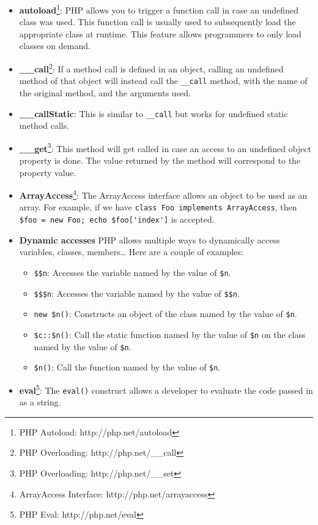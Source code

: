 \documentclass[a4paper]{article}
\begin{document}
\begin{itemize}
  \item \textbf{autoload}\footnote{PHP Autoload: http://php.net/autoload}:
    PHP allows you to trigger a function call in case an undefined class was
    used.  This function call is usually used to subsequently load the
    appropriate class at runtime. This feature allows programmers to only load
    classes on demand.
  \item \textbf{\_\_call}\footnote{PHP Overloading: http://php.net/\_\_call}:
    If a method call is defined in an object, calling an undefined method of
    that object will instead call the \verb&__call& method, with the name of
    the original method, and the arguments used.
  \item \textbf{\_\_callStatic}:
    This is similar to \verb&__call& but works for undefined static method
    calls.
  \item \textbf{\_\_get}\footnote{PHP Overloading: http://php.net/\_\_set}:
    This method will get called in case an access to an undefined object
    property is done. The value returned by the method will correspond to the
    property value.
  \item \textbf{ArrayAccess}\footnote{ArrayAccess Interface: http://php.net/arrayaccess}:
    The ArrayAccess interface allows an object to be used as an array. For example,
    if we have \verb&class Foo implements ArrayAccess&, then
    \verb&$foo = new Foo; echo $foo['index']& is accepted.
  \item \textbf{Dynamic accesses}
    PHP allows multiple ways to dynamically access variables, classes, members\ldots
    Here are a couple of examples:
    \begin{itemize}
      \item \verb/$$n/:
        Accesses the variable named by the value of \verb/$n/.
      \item \verb/$$$n/:
        Accesses the variable named by the value of \verb/$$n/.
      \item \verb/new $n()/:
        Constructs an object of the class named by the value of \verb/$n/.
      \item \verb/$c::$n()/:
        Call the static function named by the value of \verb/$n/ on the class
        named by the value of \verb/$n/.
      \item \verb/$n()/:
        Call the function named by the value of \verb/$n/.
    \end{itemize}
  \item \textbf{eval}\footnote{PHP Eval: http://php.net/eval}:
    The \verb&eval()& construct allows a developer to evaluate the code passed in as a string.
\end{itemize}
\end{document}
